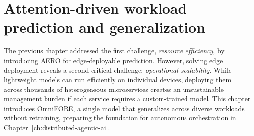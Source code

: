 \chapter{Attention-driven workload prediction and generalization}
\label{ch:attention-driven-prediction}

The previous chapter addressed the first challenge, \textit{resource efficiency}, by introducing \ac{AERO} for edge-deployable prediction. However, solving edge deployment reveals a second critical challenge: \textit{operational scalability}. While lightweight models can run efficiently on individual devices, deploying them across thousands of heterogeneous microservices creates an unsustainable management burden if each service requires a custom-trained model. This chapter introduces \ac{OmniFORE}, a single model that generalizes across diverse workloads without retraining, preparing the foundation for autonomous orchestration in Chapter~\ref{ch:distributed-agentic-ai}.






